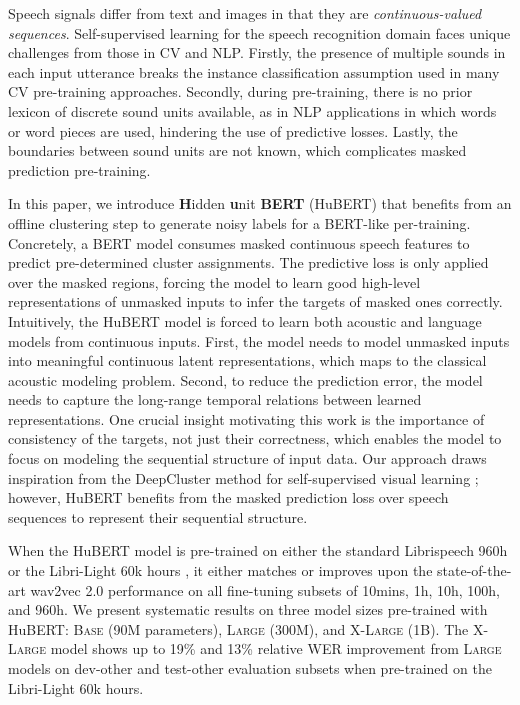 Speech signals differ from text and images in that they are \textit{continuous-valued} \textit{sequences}. Self-supervised learning for the speech recognition domain faces unique challenges from those in CV and NLP. Firstly, the presence of multiple sounds in each input utterance breaks the instance classification assumption used in many CV pre-training approaches. Secondly, during pre-training, there is no prior lexicon of discrete sound units available, as in NLP applications in which words or word pieces are used, hindering the use of predictive losses. Lastly, the boundaries between sound units are not known, which complicates masked prediction pre-training.

In this paper, we introduce \textbf{H}idden \textbf{u}nit \textbf{BERT} (HuBERT) that benefits from an offline clustering step to generate noisy labels for a BERT-like per-training. Concretely, a BERT model consumes masked continuous speech features to predict pre-determined cluster assignments. The predictive loss is only applied over the masked regions, forcing the model to learn good high-level representations of unmasked inputs to infer the targets of masked ones correctly. Intuitively, the HuBERT model is forced to learn both acoustic and language models from continuous inputs. First, the model needs to model unmasked inputs into meaningful continuous latent representations, which maps to the classical acoustic modeling problem. Second, to reduce the prediction error, the model needs to capture the long-range temporal relations between learned representations. One crucial insight motivating this work is the importance of consistency of the targets, not just their correctness, which enables the model to focus on modeling the sequential structure of input data. Our approach draws inspiration from the DeepCluster method for self-supervised visual learning \cite{caron2018deep}; however, HuBERT benefits from the masked prediction loss over speech sequences to represent their sequential structure.

When the HuBERT model is pre-trained on either the standard Librispeech 960h \cite{panayotov2015librispeech} or the Libri-Light 60k hours \cite{kahn2020libri}, it either matches or improves upon the state-of-the-art wav2vec 2.0 \cite{baevski2020wav2vec} performance on all fine-tuning subsets of 10mins, 1h, 10h, 100h, and 960h. We present systematic results on three model sizes pre-trained with HuBERT: \textsc{Base} (90M parameters), \textsc{Large} (300M), and \textsc{X-Large} (1B). The \textsc{X-Large} model shows up to 19\% and 13\% relative WER improvement from \textsc{Large} models on dev-other and test-other evaluation subsets when pre-trained on the Libri-Light 60k hours.